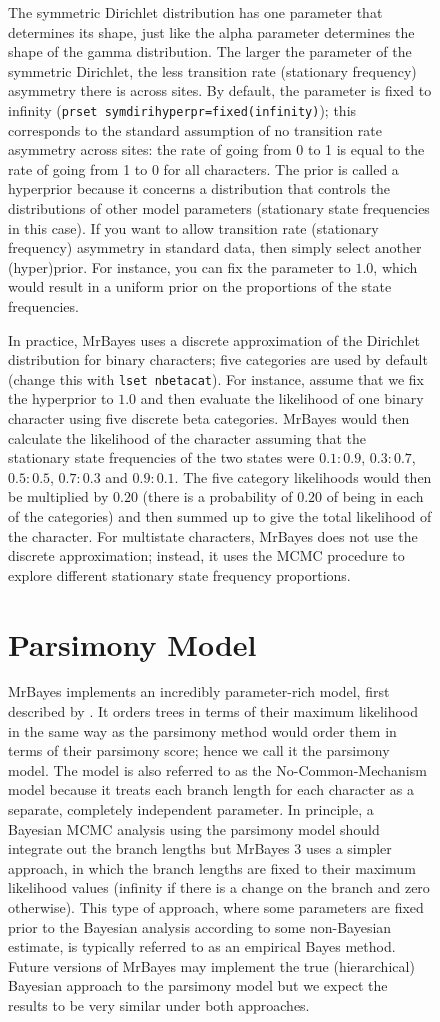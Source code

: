\documentclass[12pt]{book}
\newcommand{\ttt}[1]{\texttt{#1}}
\begin{document}
\begin{figure}[h]
The symmetric Dirichlet distribution has one parameter that determines its shape, just like the
alpha parameter determines the shape of the gamma distribution. The larger the parameter of the
symmetric Dirichlet, the less transition rate (stationary frequency) asymmetry there is across
sites. By default, the parameter is fixed to infinity (\ttt{prset symdirihyperpr=fixed(infinity)});
this corresponds to the standard assumption of no transition rate asymmetry across sites: the rate
of going from 0 to 1 is equal to the rate of going from 1 to 0 for all characters. The prior is
called a hyperprior because it concerns a distribution that controls the distributions of other
model parameters (stationary state frequencies in this case). If you want to allow transition rate
(stationary frequency) asymmetry in standard data, then simply select another (hyper)prior. For
instance, you can fix the parameter to $1.0$, which would result in a uniform prior on the
proportions of the state frequencies.

In practice, MrBayes uses a discrete approximation of the Dirichlet distribution for binary
characters; five categories are used by default (change this with \ttt{lset nbetacat}). For
instance, assume that we fix the hyperprior to $1.0$ and then evaluate the likelihood of one binary
character using five discrete beta categories. MrBayes would then calculate the likelihood of the
character assuming that the stationary state frequencies of the two states were $0.1:0.9$,
$0.3:0.7$, $0.5:0.5$, $0.7:0.3$ and $0.9:0.1$. The five category likelihoods would then be
multiplied by $0.20$ (there is a probability of $0.20$ of being in each of the categories) and then
summed up to give the total likelihood of the character. For multistate characters, MrBayes does
not use the discrete approximation; instead, it uses the MCMC procedure to explore different
stationary state frequency proportions.

\section{Parsimony Model}

MrBayes implements an incredibly parameter-rich model, first described by \citet{tuffley97}. It
orders trees in terms of their maximum likelihood in the same way as the parsimony method would
order them in terms of their parsimony score; hence we call it the parsimony model. The model is
also referred to as the No-Common-Mechanism model because it treats each branch length for each
character as a separate, completely independent parameter. In principle, a Bayesian MCMC analysis
using the parsimony model should integrate out the branch lengths but MrBayes 3 uses a simpler
approach, in which the branch lengths are fixed to their maximum likelihood values (infinity if
there is a change on the branch and zero otherwise). This type of approach, where some parameters
are fixed prior to the Bayesian analysis according to some non-Bayesian estimate, is typically
referred to as an empirical Bayes method. Future versions of MrBayes may implement the true
(hierarchical) Bayesian approach to the parsimony model but we expect the results to be very
similar under both approaches.


\end{figure}
\end{document}
